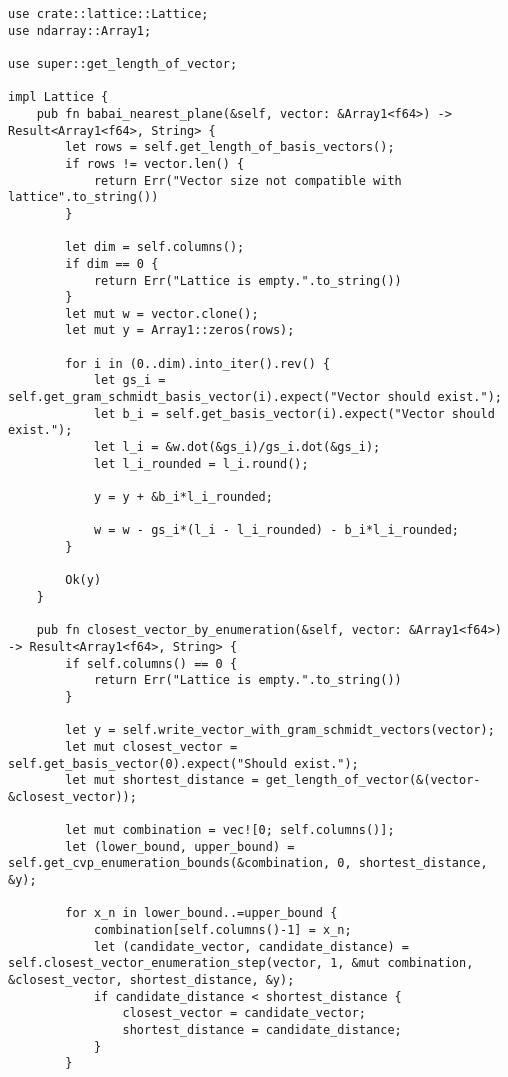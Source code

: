 \begin{verbatim}
use crate::lattice::Lattice;
use ndarray::Array1;

use super::get_length_of_vector;

impl Lattice {
    pub fn babai_nearest_plane(&self, vector: &Array1<f64>) -> Result<Array1<f64>, String> {
        let rows = self.get_length_of_basis_vectors();
        if rows != vector.len() {
            return Err("Vector size not compatible with lattice".to_string())
        }

        let dim = self.columns();
        if dim == 0 {
            return Err("Lattice is empty.".to_string())
        }
        let mut w = vector.clone();
        let mut y = Array1::zeros(rows);

        for i in (0..dim).into_iter().rev() {
            let gs_i = self.get_gram_schmidt_basis_vector(i).expect("Vector should exist.");
            let b_i = self.get_basis_vector(i).expect("Vector should exist.");
            let l_i = &w.dot(&gs_i)/gs_i.dot(&gs_i);
            let l_i_rounded = l_i.round();

            y = y + &b_i*l_i_rounded;

            w = w - gs_i*(l_i - l_i_rounded) - b_i*l_i_rounded;
        }

        Ok(y)
    }

    pub fn closest_vector_by_enumeration(&self, vector: &Array1<f64>) -> Result<Array1<f64>, String> {
        if self.columns() == 0 {
            return Err("Lattice is empty.".to_string())
        }

        let y = self.write_vector_with_gram_schmidt_vectors(vector);
        let mut closest_vector = self.get_basis_vector(0).expect("Should exist.");
        let mut shortest_distance = get_length_of_vector(&(vector-&closest_vector));

        let mut combination = vec![0; self.columns()];
        let (lower_bound, upper_bound) = self.get_cvp_enumeration_bounds(&combination, 0, shortest_distance, &y);

        for x_n in lower_bound..=upper_bound {
            combination[self.columns()-1] = x_n;
            let (candidate_vector, candidate_distance) = self.closest_vector_enumeration_step(vector, 1, &mut combination, &closest_vector, shortest_distance, &y);
            if candidate_distance < shortest_distance {
                closest_vector = candidate_vector;
                shortest_distance = candidate_distance;
            }
        }


\end{verbatim}
